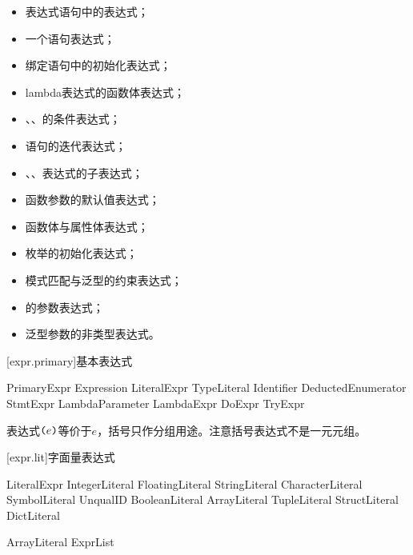 \begin{itemize}
    \item 表达式语句中的表达式；
    \item 一个语句表达式；
    \item 绑定语句中的初始化表达式；
    \item lambda表达式的函数体表达式；
    \item {}、、的条件表达式；
    \item {}语句的迭代表达式；
    \item {}、、表达式的子表达式；
    \item 函数参数的默认值表达式；
    \item 函数体与属性体表达式；
    \item 枚举的初始化表达式；
    \item 模式匹配与泛型的约束表达式；
    \item {}的参数表达式；
    \item 泛型参数的非类型表达式。
\end{itemize}

[expr.primary]{基本表达式}

\begin{bnf}{PrimaryExpr}
    \terminal{(} Expression \terminal{)} \br
    LiteralExpr \br
    TypeLiteral \br
    Identifier \br
    DeductedEnumerator \br
     \br
    \terminal{\$} \br
    StmtExpr \br
    LambdaParameter \br
    LambdaExpr \br
    DoExpr \br
    TryExpr
\end{bnf}

\pnum
表达式$\texttt{(}e\texttt{)}$等价于$e$，括号只作分组用途。\enternote 注意括号表达式不是一元元组。\exitnote

[expr.lit]{字面量表达式}

\begin{bnf}{LiteralExpr}
    IntegerLiteral \br
    FloatingLiteral \br
    StringLiteral \br
    CharacterLiteral \br
    SymbolLiteral \br
     UnqualID \terminal{)} \br
    BooleanLiteral \br
     \br
    ArrayLiteral \br
    TupleLiteral \br
    StructLiteral \br
    DictLiteral
\end{bnf}

\begin{bnf}{ArrayLiteral}
    \terminal{[} ExprList\bnfq \terminal{]}
\end{bnf}

